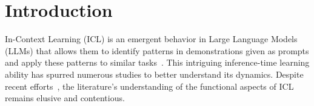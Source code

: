 \documentclass[11pt]{article}
\newcommand{\daniel}[1]{{\color{purple}[{\bf DK}: #1]}}
\begin{document}
\section{Introduction}
\label{sec:intro}




In-Context Learning (ICL) is an emergent behavior in Large Language Models (LLMs) that allows them to identify patterns in demonstrations given as prompts and apply these patterns to similar tasks~\citep{brown2020language}.
This intriguing inference-time learning ability has spurred numerous studies to better understand its dynamics. Despite recent efforts~\cite{xie2021explanation,min2022rethinking,srivastava2023beyond,shin2022effect,razeghi2022impact,von2023transformers,shen2024icl_vs_gd}, the literature's understanding of the functional aspects of ICL remains elusive and contentious.



\end{document}
